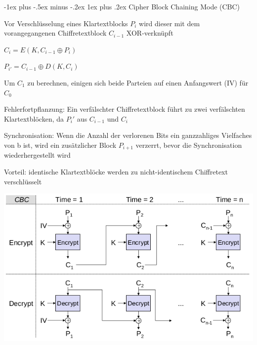 \documentclass[a4paper]{article}
\makeatletter
\renewcommand{\subsubsection}{\@startsection{subsubsection}{3}{0mm}%
 {-1ex plus -.5ex minus -.2ex}%
 {1ex plus .2ex}%
 {\normalfont\small\bfseries}}
\makeatother
\begin{document}
\begin{multicols}{3}
      \subsubsection{Cipher Block Chaining Mode (CBC)}
      \begin{itemize*}
            \item Vor Verschlüsselung eines Klartextblocks $P_i$ wird dieser mit dem vorangegangenen Chiffretextblock $C_{i-1}$ XOR-verknüpft
            \begin{itemize*}
                  \item $C_i = E(K, C_{i-1} \oplus P_i)$
                  \item $P_{i'} = C_{i-1} \oplus D(K, C_i)$
                  \item Um $C_1$ zu berechnen, einigen sich beide Parteien auf einen Anfangswert (IV) für $C_0$
            \end{itemize*}
            \item Fehlerfortpflanzung: Ein verfälschter Chiffretextblock führt zu zwei verfälschten Klartextblöcken, da $P_i'$ aus $C_{i-1}$ und $C_i$
            \item Synchronisation: Wenn die Anzahl der verlorenen Bits ein ganzzahliges Vielfaches von b ist, wird ein zusätzlicher Block $P_{i+1}$ verzerrt, bevor die Synchronisation wiederhergestellt wird %
            \item Vorteil: identische Klartextblöcke werden zu nicht-identischem Chiffretext verschlüsselt
      \end{itemize*}
      \begin{center}
            \includegraphics[width=.6\linewidth]{Assets/NetworkSecurity-cipher-block-chaining-mode.png}
      \end{center}


\end{multicols}
\end{document}
